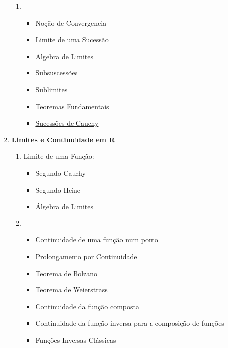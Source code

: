 \documentclass[12pt]{article}
\begin{document}
\begin{multicols}{2}
\begin{enumerate}[label=\arabic*.]
\begin{enumerate}
		\item \
		\begin{itemize}[left = -9mm]
			
			\item Noção de Convergencia
			
			\item \hyperref[sucessao limitada]
				 {Limite de uma Sucessão}
				 
			\item \hyperref[algebra de limites]
				 {Algebra de Limites}
				 
			\item \hyperref[subsucessoes]{Subsuscessões}
			\item Sublimites
			\item Teoremas Fundamentais
			\item \hyperref[sucessao de cauchy]
				 {Sucessões de Cauchy}
			
		\end{itemize}
	
	\end{enumerate}
	
	\vspace{3mm}
	
	\item {\bfseries
		Limites e Continuidade em R
	}
	\begin{enumerate}
	[label=\theenumi\arabic*., left = -5.4mm]
		
		\item Limite de uma Função:
		\begin{itemize}[left = -9mm]
		
			\item Segundo Cauchy
			\item Segundo Heine
			\item Álgebra de Limites
		
		\end{itemize}
		
		\item \
		\begin{itemize}[left = -9mm]
		
			\item Continuidade de uma função num ponto
			\item Prolongamento por Continuidade
			\item Teorema de Bolzano
			\item Teorema de Weierstrass
			\item Continuidade da função composta
			\item Continuidade da função inversa
				 para a composição de funções
			\item Funções Inversas Clássicas
		\end{itemize}
		

\end{enumerate}
\end{enumerate}
\end{multicols}
\end{document}
